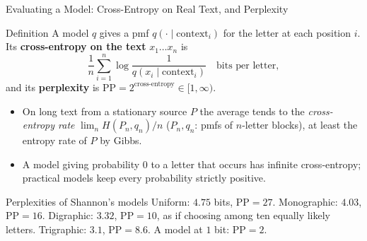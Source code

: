 \begin{frame}{Evaluating a Model: Cross-Entropy on Real Text, and Perplexity}
  \small
  \begin{block}{Definition}
    A model $q$ gives a pmf $q(\cdot\mid\text{context}_i)$ for the letter at each position $i$. Its \textbf{cross-entropy on the text} $x_1\dots x_n$ is
    \[
      \frac1n\sum_{i=1}^n\log\frac1{q(x_i\mid\text{context}_i)}\quad\text{bits per letter},
    \]
    and its \textbf{perplexity} is $\mathrm{PP}=2^{\text{cross-entropy}}\in[1,\infty)$.
  \end{block}
  \begin{itemize}
    \item On long text from a stationary source $P$ the average tends to the \emph{cross-entropy rate} $\lim_{n}H(P_n,q_n)/n$ ($P_n,q_n$: pmfs of $n$-letter blocks), at least the entropy rate of $P$ by Gibbs.
    \item A model giving probability $0$ to a letter that occurs has infinite cross-entropy; practical models keep every probability strictly positive.
  \end{itemize}
  \begin{exampleblock}{Perplexities of Shannon's models}
    Uniform: $4.75$ bits, $\mathrm{PP}=27$. Monographic: $4.03$, $\mathrm{PP}=16$. Digraphic: $3.32$, $\mathrm{PP}=10$, as if choosing among ten equally likely letters. Trigraphic: $3.1$, $\mathrm{PP}=8.6$. A model at $1$ bit: $\mathrm{PP}=2$.
  \end{exampleblock}
\end{frame}

